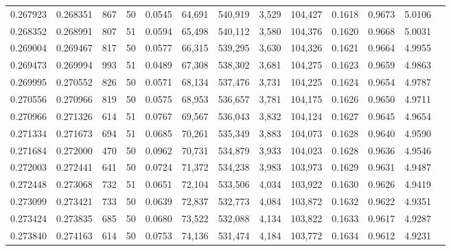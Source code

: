 \begin{tabular}{rrrrrrrrrrrrr}
0.267923 & 0.268351 &   867 &  50 &                                     0.0545 &  64,691 & 540,919 &   3,529 & 104,427 & 0.1618 & 0.9673 & 5.0106 \\
0.268352 & 0.268991 &   807 &  51 &                                     0.0594 &  65,498 & 540,112 &   3,580 & 104,376 & 0.1620 & 0.9668 & 5.0031 \\
0.269004 & 0.269467 &   817 &  50 &                                     0.0577 &  66,315 & 539,295 &   3,630 & 104,326 & 0.1621 & 0.9664 & 4.9955 \\
0.269473 & 0.269994 &   993 &  51 &                                     0.0489 &  67,308 & 538,302 &   3,681 & 104,275 & 0.1623 & 0.9659 & 4.9863 \\
0.269995 & 0.270552 &   826 &  50 &                                     0.0571 &  68,134 & 537,476 &   3,731 & 104,225 & 0.1624 & 0.9654 & 4.9787 \\
0.270556 & 0.270966 &   819 &  50 &                                     0.0575 &  68,953 & 536,657 &   3,781 & 104,175 & 0.1626 & 0.9650 & 4.9711 \\
0.270966 & 0.271326 &   614 &  51 &                                     0.0767 &  69,567 & 536,043 &   3,832 & 104,124 & 0.1627 & 0.9645 & 4.9654 \\
0.271334 & 0.271673 &   694 &  51 &                                     0.0685 &  70,261 & 535,349 &   3,883 & 104,073 & 0.1628 & 0.9640 & 4.9590 \\
0.271684 & 0.272000 &   470 &  50 &                                     0.0962 &  70,731 & 534,879 &   3,933 & 104,023 & 0.1628 & 0.9636 & 4.9546 \\
0.272003 & 0.272441 &   641 &  50 &                                     0.0724 &  71,372 & 534,238 &   3,983 & 103,973 & 0.1629 & 0.9631 & 4.9487 \\
0.272448 & 0.273068 &   732 &  51 &                                     0.0651 &  72,104 & 533,506 &   4,034 & 103,922 & 0.1630 & 0.9626 & 4.9419 \\
0.273099 & 0.273421 &   733 &  50 &                                     0.0639 &  72,837 & 532,773 &   4,084 & 103,872 & 0.1632 & 0.9622 & 4.9351 \\
0.273424 & 0.273835 &   685 &  50 &                                     0.0680 &  73,522 & 532,088 &   4,134 & 103,822 & 0.1633 & 0.9617 & 4.9287 \\
0.273840 & 0.274163 &   614 &  50 &                                     0.0753 &  74,136 & 531,474 &   4,184 & 103,772 & 0.1634 & 0.9612 & 4.9231 \\

\end{tabular}

